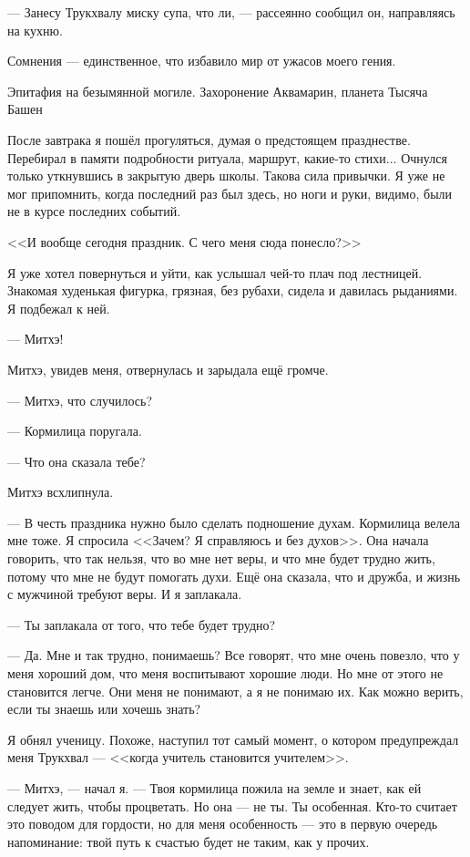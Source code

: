 --- Занесу Трукхвалу миску супа, что ли, --- рассеянно сообщил он, направляясь на кухню.

\asterism

\epigraph
{Сомнения --- единственное, что избавило мир от ужасов моего гения.}
{Эпитафия на безымянной могиле.
Захоронение Аквамарин, планета Тысяча Башен}

После завтрака я пошёл прогуляться, думая о предстоящем празднестве.
Перебирал в памяти подробности ритуала, маршрут, какие-то стихи...
Очнулся только уткнувшись в закрытую дверь школы.
Такова сила привычки.
Я уже не мог припомнить, когда последний раз был здесь, но ноги и руки, видимо, были не в курсе последних событий.

<<И вообще сегодня праздник.
С чего меня сюда понесло?>>

Я уже хотел повернуться и уйти, как услышал чей-то плач под лестницей.
Знакомая худенькая фигурка, грязная, без рубахи, сидела и давилась рыданиями.
Я подбежал к ней.

--- Митхэ!

Митхэ, увидев меня, отвернулась и зарыдала ещё громче.

--- Митхэ, что случилось?

--- Кормилица поругала.

--- Что она сказала тебе?

Митхэ всхлипнула.

--- В честь праздника нужно было сделать подношение духам.
Кормилица велела мне тоже.
Я спросила <<Зачем?
Я справляюсь и без духов>>.
Она начала говорить, что так нельзя, что во мне нет веры, и что мне будет трудно жить, потому что мне не будут помогать духи.
Ещё она сказала, что и дружба, и жизнь с мужчиной требуют веры.
И я заплакала.

--- Ты заплакала от того, что тебе будет трудно?

--- Да.
Мне и так трудно, понимаешь?
Все говорят, что мне очень повезло, что у меня хороший дом, что меня воспитывают хорошие люди.
Но мне от этого не становится легче.
Они меня не понимают, а я не понимаю их.
Как можно верить, если ты знаешь или хочешь знать?

Я обнял ученицу.
Похоже, наступил тот самый момент, о котором предупреждал меня Трукхвал --- <<когда учитель становится учителем>>.

--- Митхэ, --- начал я.
--- Твоя кормилица пожила на земле и знает, как ей следует жить, чтобы процветать.
Но она --- не ты.
Ты особенная.
Кто-то считает это поводом для гордости, но для меня особенность --- это в первую очередь напоминание: твой путь к счастью будет не таким, как у прочих.

